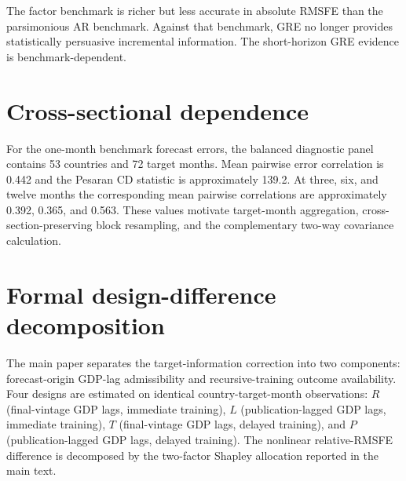 \documentclass[12pt]{article}
\begin{document}
\begin{table}[htbp]
\centering\scriptsize
\caption{GRE against the wide factor-augmented benchmark at one month}
\end{table}
The factor benchmark is richer but less accurate in absolute RMSFE than the parsimonious AR benchmark. Against that benchmark, GRE no longer provides statistically persuasive incremental information. The short-horizon GRE evidence is benchmark-dependent.

\section{Cross-sectional dependence}
For the one-month benchmark forecast errors, the balanced diagnostic panel contains 53 countries and 72 target months. Mean pairwise error correlation is 0.442 and the Pesaran CD statistic is approximately 139.2. At three, six, and twelve months the corresponding mean pairwise correlations are approximately 0.392, 0.365, and 0.563. These values motivate target-month aggregation, cross-section-preserving block resampling, and the complementary two-way covariance calculation.

\section{Formal design-difference decomposition}
The main paper separates the target-information correction into two components: forecast-origin GDP-lag admissibility and recursive-training outcome availability. Four designs are estimated on identical country-target-month observations: $R$ (final-vintage GDP lags, immediate training), $L$ (publication-lagged GDP lags, immediate training), $T$ (final-vintage GDP lags, delayed training), and $P$ (publication-lagged GDP lags, delayed training). The nonlinear relative-RMSFE difference is decomposed by the two-factor Shapley allocation reported in the main text.
\end{document}
